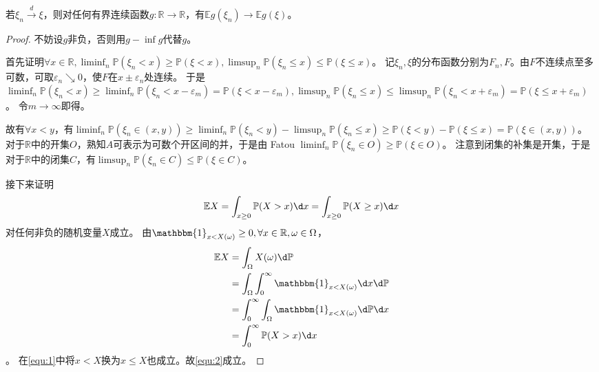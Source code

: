 \documentclass{ctexart}
\begin{document}
\begin{lemma}\label{lem:1}
  若\(\xi_n \overset{d}{\to} \xi\)，则对任何有界连续函数\(g:\mathbb{R} \to \mathbb{R} \)，有\(\mathbb{E} g(\xi_n) \to \mathbb{E} g(\xi) \)。
\end{lemma}
\begin{proof}
  不妨设\(g \)非负，否则用\(g-\inf g \)代替\(g \)。

  首先证明\(\forall x \in \mathbb{R},\liminf_{n}\mathbb{P}(\xi_n<x) \geq \mathbb{P}(\xi<x),\limsup_{n}\mathbb{P}(\xi_n \leq x) \leq \mathbb{P}(\xi \leq x) \)。
  记\(\xi_n,\xi \)的分布函数分别为\(F_n,F \)。由\(F \)不连续点至多可数，可取\(\varepsilon_n \searrow 0\)，使\(F \)在\(x \pm \varepsilon_n \)处连续。
  于是\(\liminf_{n}\mathbb{P}(\xi_n<x) \geq \liminf_{n}\mathbb{P}(\xi_n<x-\varepsilon_m)=\mathbb{P}(\xi<x-\varepsilon_m),\limsup_{n}\mathbb{P}(\xi_n \leq x) \leq \limsup_{n}\mathbb{P}(\xi_n<x+\varepsilon_m) = \mathbb{P}(\xi \leq x+\varepsilon_m) \)。
  令\(m \to \infty \)即得。

  故有\(\forall x<y \)，有\(\liminf_{n} \mathbb{P}(\xi_n \in (x,y)) \geq \liminf_{n}\mathbb{P}(\xi_n<y)-\limsup_{n}\mathbb{P}(\xi_n \leq x) \geq \mathbb{P}(\xi<y)-\mathbb{P}(\xi \leq x)=\mathbb{P}(\xi \in (x,y)) \)。
  对于\(\mathbb{R} \)中的开集\(O \)，熟知\(A \)可表示为可数个开区间的并，于是由 Fatou \(\liminf_{n}\mathbb{P}(\xi_n \in O) \geq \mathbb{P}(\xi \in O) \)。
  注意到闭集的补集是开集，于是对于\(\mathbb{R} \)中的闭集\(C \)，有\(\limsup_{n}\mathbb{P}(\xi_n \in C) \leq \mathbb{P}(\xi \in C) \)。

  接下来证明
  \begin{equation}\label{equ:2}
    \mathbb{E} X = \int_{x \geq 0} \mathbb{P}(X>x) \d x=\int_{x \geq 0} \mathbb{P}(X \geq x) \d x
  \end{equation}
  对任何非负的随机变量\(X \)成立。
  由\(\mathbbm{1}_{x<X(\omega)} \geq 0,\forall x \in \mathbb{R},\omega \in \Omega \)，
  \begin{equation} \label{equ:1}
    \begin{aligned}
      \mathbb{E} X&=\int_{\Omega} X(\omega) \d \mathbb{P}\\
      &=\int_{\Omega} \int_{0}^{\infty} \mathbbm{1}_{x < X(\omega)} \d x \d \mathbb{P}\\
      &=\int_{0}^{\infty} \int_{\Omega} \mathbbm{1}_{x < X(\omega)} \d \mathbb{P} \d x\\
      &=\int_{0}^{\infty} \mathbb{P}(X>x) \d x
    \end{aligned}
  \end{equation}。
  在\eqref{equ:1}中将\(x<X \)换为\(x \leq X \)也成立。故\eqref{equ:2}成立。


\end{proof}
\end{document}
